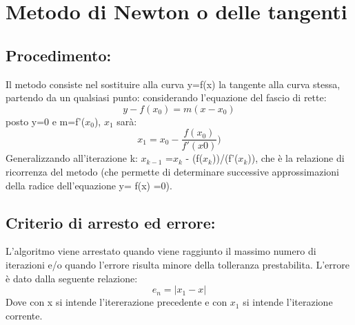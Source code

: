 \documentclass[a4paper,12pt,]{article}
\begin{document}
\section {Metodo di Newton o delle tangenti}		
\subsection{Procedimento:}
Il metodo consiste nel sostituire alla curva  y=f(x)  la tangente alla curva stessa, partendo da un qualsiasi punto: considerando l’equazione del fascio di rette:
\begin{equation} y - f(x_0)=m(x-x_0)\end{equation} posto y=0 e m=f'($x_0$), $x_1$ sarà:\begin{equation} x_1=x_0-\frac {f(x_0)}{f'(x0)}) \end{equation}
Generalizzando all’iterazione   k: $x_{k-1}$ =$x_k$ - (f($x_k$))/(f'($x_k$)), che è la relazione di ricorrenza del metodo (che permette di determinare successive 	approssimazioni della radice dell'equazione y= f(x) =0).
\subsection{Criterio di arresto ed errore:}
L'algoritmo viene arrestato quando viene raggiunto il massimo numero di iterazioni e/o quando l'errore risulta minore della tolleranza prestabilita.
L'errore è dato dalla seguente relazione:
\begin{equation} e_n=|x_1-x| \end{equation}
Dove con x si intende l'itererazione precedente e con $x_1$ si intende l'iterazione corrente.
\end{document}
